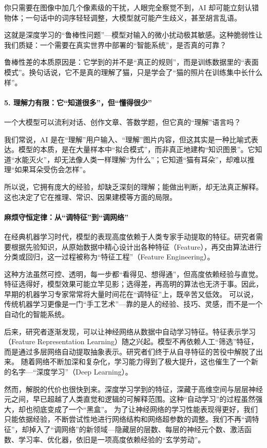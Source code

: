 你只需要在图像中加几个像素级的干扰，人眼完全察觉不到，AI 却可能立刻认错物体；一句话中的词序轻轻调整，大模型就可能产生歧义，甚至胡言乱语。

这就是深度学习的“鲁棒性问题”---模型对输入的微小扰动极其敏感。这种脆弱性让我们质疑：一个需要在真实世界中部署的“智能系统”，是否真的可靠？

鲁棒性差的本质原因是：它学到的并不是“真正的规则”，而是训练数据里的“表面模式”。换句话说，它不是真的理解了猫，只是学会了“猫的照片在训练集中长什么样”。

\paragraph*{5. 理解力有限：它“知道很多”，但“懂得很少”}

一个大模型可以流利对话、创作文章、答数学题，但它真的“理解”语言吗？

我们常说，AI 是在“理解”用户输入、“理解”图片内容，但这其实是一种比喻式表达。模型的本质，是在大量样本中“拟合模式”，而非真正地建构“知识图景”。它知道“水能灭火”，却无法像人类一样理解“为什么”；它知道“猫有耳朵”，却难以推理“如果耳朵受伤会怎样”。

所以说，它拥有庞大的经验，却缺乏深刻的理解；能做出判断，却无法真正解释。这也决定了它在推理、常识、因果建模等方面的局限。

\paragraph*{麻烦守恒定律：从“调特征”到“调网络”}
在经典机器学习时代，模型的表现高度依赖于人类专家手动提取的特征。研究者需要根据先验知识，从原始数据中精心设计出各种特征（Feature），再交由算法进行分类或回归，这一过程被称为“特征工程”（Feature Engineering）。

这种方法虽然可控、透明，每一步都“看得见、想得通”，但高度依赖经验与直觉。特征选得好，模型效果可能立竿见影；选得差，再高明的算法也无济于事。因此，早期的机器学习专家常常将大量时间花在“调特征”上，既辛苦又低效。
可以说，传统机器学习更像是一门“手工艺术”---靠的是人的经验、技巧、灵感，而不是一个自动化的智能系统。

后来，研究者逐渐发现，可以让神经网络从数据中自动学习特征。特征表示学习（Feature Representation Learning）随之兴起。模型不再依赖人工“筛选”特征，而是通过多层网络自动提取抽象表示。研究者们终于从自寻特征的苦役中解脱了出来。
随着网络不断加深和复杂化，学习能力得到了极大提升，这也催生了一个新的名字---“深度学习”（Deep Learning）。

然而，解脱的代价也很快到来。深度学习学到的特征，深藏于高维空间与层层神经元之间，早已超越了人类直觉和逻辑的可解释范围。这种“自动学习”的过程虽然强大，却也彻底变成了一个“黑盒”。
为了让神经网络的学习性能表现得更好，我们只能依据经验，不断尝试性地进行网络结构和网络超参数的调整。我们不再“调特征”，却掉入了“调网络”的新领域---隐藏层的层数、每层的神经元个数、激活函数、学习率、优化器，依旧是一项高度依赖经验的“玄学劳动”。

